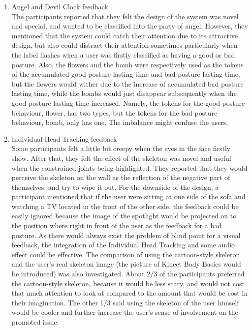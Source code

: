 \begin{enumerate}
\item Angel and Devil Clock feedback \hfill \\
The participants reported that they felt the design of the system was novel and special, and wanted to be classified into the party of angel. However, they mentioned that the system could catch their attention due to its attractive design, but also could distract their attention sometimes particularly when the label flashes when a user was firstly classified as having a good or bad posture. Also, the flowers and the bomb were respectively used as the tokens of the accumulated good posture lasting time and bad posture lasting time, but the flowers would wither due to the increase of accumulated bad posture lasting time, while the bombs would just disappear subsequently when the good posture lasting time increased. Namely, the tokens for the good posture behaviour, flower, has two types, but the tokens for the bad posture behaviour, bomb, only has one. The imbalance might confuse the users.
\item Individual Head Tracking feedback \hfill \\
Some participants felt a little bit creepy when the eyes in the face firstly show. After that, they felt the effect of the skeleton was novel and useful when the constrained joints being highlighted. They reported that they would perceive the skeleton on the wall as the reflection of the negative part of themselves, and try to wipe it out. For the downside of the design, a participant mentioned that if the user were sitting at one side of the sofa and watching a TV located in the front of the other side, the feedback could be easily ignored because the image of the spotlight would be projected on to the position where right in front of the user as the feedback for a bad posture. As there would always exist the problem of blind point for a visual feedback, the integration of the Individual Head Tracking and some audio effect could be effective. The comparison of using the cartoon-style skeleton and the user’s real skeleton image (the picture of Kinect Body Basics would be introduced) was also investigated. About 2/3 of the participants preferred the cartoon-style skeleton, because it would be less scary, and would not cost that much attention to look at compared to the amount that would be cost in their imagination. The other 1/3 said using the skeleton of the user himself would be cooler and further increase the user’s sense of involvement on the promoted issue.

\end{enumerate}
